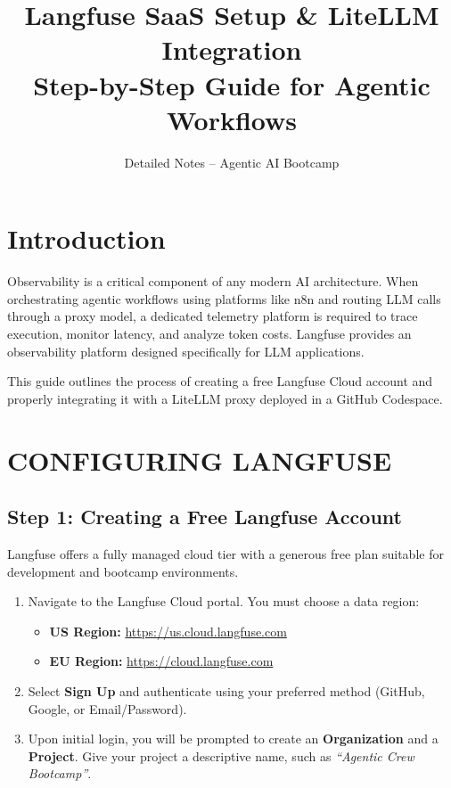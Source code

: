 \documentclass[12pt,a4paper]{article}
\title{\textbf{Langfuse SaaS Setup \& LiteLLM Integration}\\\large Step-by-Step Guide for Agentic Workflows}
\author{Detailed Notes -- Agentic AI Bootcamp}\date{}
\begin{document}
\maketitle\tableofcontents\newpage

\section{Introduction}
Observability is a critical component of any modern AI architecture. When orchestrating agentic workflows using platforms like n8n and routing LLM calls through a proxy model, a dedicated telemetry platform is required to trace execution, monitor latency, and analyze token costs. Langfuse provides an observability platform designed specifically for LLM applications.

This guide outlines the process of creating a free Langfuse Cloud account and properly integrating it with a LiteLLM proxy deployed in a GitHub Codespace.

\section{CONFIGURING LANGFUSE}

\subsection{Step 1: Creating a Free Langfuse Account}
Langfuse offers a fully managed cloud tier with a generous free plan suitable for development and bootcamp environments.

\begin{enumerate}
    \item Navigate to the Langfuse Cloud portal. You must choose a data region:
    \begin{itemize}
        \item \textbf{US Region:} \url{https://us.cloud.langfuse.com}
        \item \textbf{EU Region:} \url{https://cloud.langfuse.com}
    \end{itemize}
    \item Select \textbf{Sign Up} and authenticate using your preferred method (GitHub, Google, or Email/Password).
    \item Upon initial login, you will be prompted to create an \textbf{Organization} and a \textbf{Project}. Give your project a descriptive name, such as \textit{``Agentic Crew Bootcamp''}.
\end{enumerate}
\end{document}
